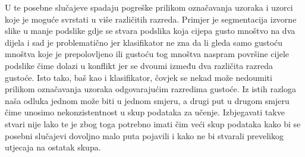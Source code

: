 \documentclass[times, utf8, zavrsni]{fer}
\begin{document}
\bigbreak

U te posebne slučajeve
spadaju pogreške prilikom označavanja uzoraka i uzorci koje je moguće svrstati u više različitih razreda. Primjer je
segmentacija izvorne slike u manje podslike gdje se stvara podslika koja cijepa gusto mnoštvo na dva dijela
i sad je problematično jer klasifikator ne zna da li gleda samo gustoću mnoštva koje je prepolovljeno ili gustoću 
tog mnoštva naspram površine cijele podslike čime dolazi u konflikt jer se dvoumi između dva različita razreda gustoće.
Isto tako, baš kao i klasifikator, čovjek se nekad može nedoumiti prilikom označavanja uzoraka
odgovarajućim razredima gustoće. Iz istih razloga naša odluka jednom može biti u jednom smjeru, a 
drugi put u drugom smjeru čime unosimo nekonzistentnost u skup podataka za učenje. Izbjegavati takve
stvari nije lako te je zbog toga potrebno imati čim veći skup podataka kako bi se posebni slučajevi
dovoljno malo puta pojavili i kako ne bi stvarali prevelikog utjecaja na ostatak skupa. 
\end{document}
